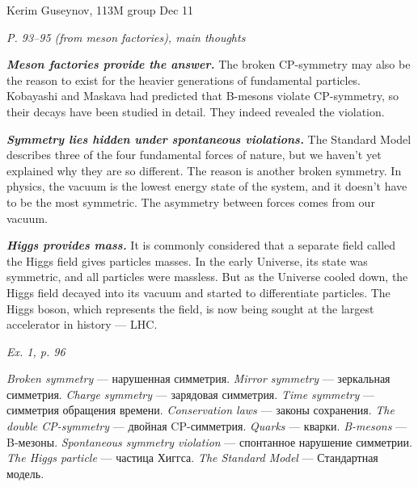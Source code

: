 \documentclass[a4paper, 12pt]{article}
\def\task#1{\begin{center}\it #1\end{center}}
\begin{document}
\noindent
Kerim Guseynov, 113M group
\hfill
Dec 11

\task{P. 93--95 (from meson factories), main thoughts}
\par\textbf{\textit{Meson factories provide the answer.}}
The broken CP-symmetry may also be the reason to exist for the heavier 
generations of fundamental particles. Kobayashi and Maskava had 
predicted that B-mesons violate CP-symmetry, so their decays have been 
studied in detail. They indeed revealed the violation.

\textbf{\textit{Symmetry lies hidden under spontaneous violations.}}
The Standard Model describes three of the four fundamental forces of 
nature, but we haven't yet explained why they are so different. The 
reason is another broken symmetry. In physics, the vacuum is the lowest 
energy state of the system, and it doesn't have to be the most 
symmetric. The asymmetry between forces comes from our vacuum.

\textbf{\textit{Higgs provides mass.}}
It is commonly considered that a separate field called the Higgs field 
gives particles masses. In the early Universe, its state was symmetric, 
and all particles were massless. But as the Universe cooled down, the 
Higgs field decayed into its vacuum and started to differentiate 
particles. The Higgs boson, which represents the field, is now being 
sought at the largest accelerator in history --- LHC.

\task{Ex. 1, p. 96}
\textit{Broken symmetry} --- нарушенная симметрия.
\textit{Mirror symmetry} --- зеркальная симметрия.
\textit{Charge symmetry} --- зарядовая симметрия.
\textit{Time symmetry} --- симметрия обращения времени.
\textit{Conservation laws} --- законы сохранения.
\textit{The double CP-symmetry} --- двойная CP-симметрия.
\textit{Quarks} --- кварки.
\textit{B-mesons} --- B-мезоны.
\textit{Spontaneous symmetry violation} --- спонтанное нарушение симметрии.
\textit{The Higgs particle} --- частица Хиггса.
\textit{The Standard Model} --- Стандартная модель.
\end{document}
